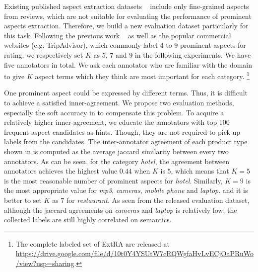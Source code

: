 Existing published aspect extraction datasets ~\cite{hu2004mining,popescu2007extracting,pavlopoulos2014aspect,ding2008holistic} 
include only fine-grained aspects from reviews,
which are not suitable for evaluating the performance of 
prominent aspects extraction. 
Therefore, we build a new evaluation dataset particularly 
for this task.
Following the previous work 
~\cite{ganu2009beyond,brody2010unsupervised,zhao2010jointly,wang2015sentiment} as well as
the popular commercial websites (e.g. TripAdvisor), 
which commonly label 4 to 9 prominent aspects for
rating, we respectively set $K$ as $5$, $7$ and $9$
in the following experiments.
We have five annotators in total.
We ask each annotator who are familiar with the domain 
to give $K$ aspect terms which they think are most important
for each category. 
\footnote{The 
	complete labeled set of ExtRA are released at \url{https://drive.google.com/file/d/10t0Y4YSUtW7cRQWgfaHvLvECjOaPRuWo/view?usp=sharing}.
}

One prominent aspect could be expressed by different terms.
Thus, it is difficult to achieve a satisfied inner-agreement.
We propose two evaluation methods, especially the 
soft accuracy in  to compensate this problem.
To acquire a relatively higher inner-agreement, 
we educate the annotators with top 100 frequent aspect candidates
as hints. Though, they are not required to pick up labels from 
the candidates.
The inter-annotator agreement of each
product type shown in  is computed as the average jaccard similarity between every two annotators.
As can be seen, for the category \textit{hotel},
the agreement between annotators 
achieves the highest value $0.44$ when $K$ is $5$,
which means that $K=5$ is the most reasonable 
number of prominent aspects for \textit{hotel}.
Similarly, $K=9$ is the most appropriate value for
\textit{mp3}, \textit{cameras}, \textit{mobile phone} and \textit{laptop}.
and it is better to set $K$ as $7$ for \textit{restaurant}.
As seen from the released evaluation dataset,
although the jaccard agreements on \textit{cameras}
and \textit{laptop} is relatively low,
the collected labels are still highly correlated on semantics.

